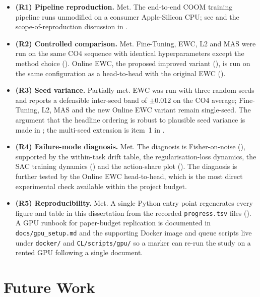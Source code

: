 \begin{itemize}
    \item \textbf{(R1) Pipeline reproduction.} Met. The
        end-to-end COOM training pipeline runs unmodified on a
        consumer Apple-Silicon CPU; see  and the
        scope-of-reproduction discussion in
        .
    \item \textbf{(R2) Controlled comparison.} Met. Fine-Tuning,
        EWC, L2 and MAS were run on the same CO4 sequence with
        identical hyperparameters except the method choice
        (). Online EWC, the proposed
        improved variant (), is run on
        the same configuration as a head-to-head with the
        original EWC ().
    \item \textbf{(R3) Seed variance.} Partially met. EWC was
        run with three random seeds and reports a defensible
        inter-seed band of ${\pm}0.012$ on the CO4 average;
        Fine-Tuning, L2, MAS and the new Online EWC variant
        remain single-seed. The argument that the headline
        ordering is robust to plausible seed variance is made
        in ; the multi-seed extension is
        item~1 in .
    \item \textbf{(R4) Failure-mode diagnosis.} Met. The
        diagnosis is Fisher-on-noise
        (), supported by the
        within-task drift table, the regularisation-loss
        dynamics, the SAC training dynamics
        () and the action-share
        plot (). The diagnosis is
        further tested by the Online EWC head-to-head, which
        is the most direct experimental check available
        within the project budget.
    \item \textbf{(R5) Reproducibility.} Met. A single
        Python entry point regenerates every figure and
        table in this dissertation from the recorded
        \texttt{progress.tsv} files (). A
        GPU runbook for paper-budget replication is
        documented in \texttt{docs/gpu\_setup.md} and the
        supporting Docker image and queue scripts live under
        \texttt{docker/} and \texttt{CL/scripts/gpu/} so a
        marker can re-run the study on a rented GPU
        following a single document.
\end{itemize}

\section{Future Work}
\label{sec:future}

